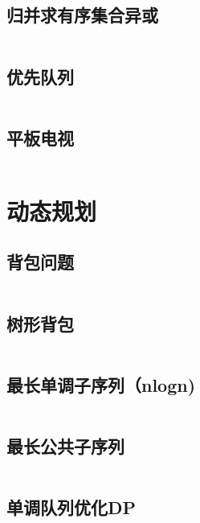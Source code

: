 \inputminted{cpp}{code/random.cc}

\subsection{归并求有序集合异或} 

\inputminted{cpp}{code/set_symmetric_difference.cc}

\subsection{优先队列} 

\inputminted{cpp}{code/priority_queue.cc}

\subsection{平板电视} 

\inputminted{cpp}{code/pb_ds.cc}

\section{动态规划} 
\subsection{背包问题} 

\inputminted{cpp}{code/背包.cc}

\subsection{树形背包} 

\inputminted{cpp}{code/树形背包.cc}

\subsection{最长单调子序列（nlogn)} 

\inputminted{cpp}{code/LIS(nlogn).cc}

\subsection{最长公共子序列} 

\inputminted{cpp}{code/LCS.cc}

\subsection{单调队列优化DP} 

